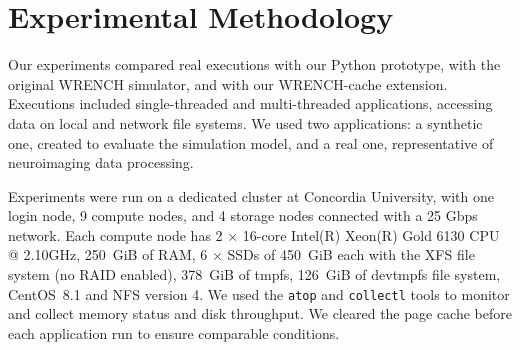 \documentclass[conference]{IEEEtran}
\newcommand{\wrench}{WRENCH\xspace}
\begin{document}
        \section{Experimental Methodology}




        Our experiments compared real executions with our Python prototype,
        with the original \wrench simulator, and with our \wrench-cache
        extension. Executions included single-threaded and multi-threaded
        applications, accessing data on local and network file systems. We
        used two applications: a synthetic one, created to evaluate the
        simulation model, and a real one, representative of neuroimaging
        data processing.

        Experiments were run on a dedicated cluster at
        Concordia University, with one login node, 9 compute nodes, and 4
        storage nodes connected with a 25 Gbps network. Each
        compute node has 2 $\times$ 16-core Intel(R) Xeon(R) Gold 6130 CPU
        @ 2.10GHz, 250~GiB of RAM, 6 $\times$ SSDs of 450~GiB each with the XFS
        file system (no RAID enabled), 378~GiB of tmpfs, 126~GiB of devtmpfs file system,
        CentOS~8.1 and NFS version 4. We used the \texttt{atop}
        and \texttt{collectl} tools to monitor and collect memory status
        and disk throughput. We cleared the page
        cache before each application run to ensure comparable
        conditions.
\end{document}
